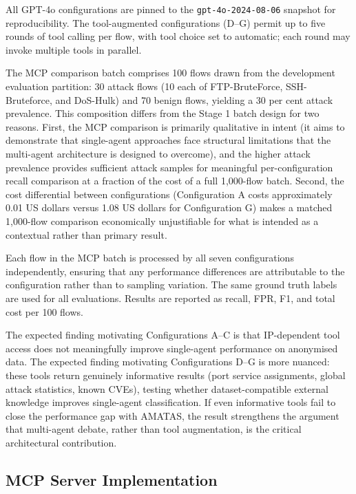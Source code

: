 \documentclass[../main.tex]{subfiles}
\begin{document}
\noindent All GPT-4o configurations are pinned to the \texttt{gpt-4o-2024-08-06} snapshot for reproducibility. The tool-augmented configurations (D--G) permit up to five rounds of tool calling per flow, with tool choice set to automatic; each round may invoke multiple tools in parallel.

The MCP comparison batch comprises 100 flows drawn from the development evaluation partition: 30 attack flows (10 each of FTP-BruteForce, SSH-Bruteforce, and DoS-Hulk) and 70 benign flows, yielding a 30 per cent attack prevalence. This composition differs from the Stage 1 batch design for two reasons. First, the MCP comparison is primarily qualitative in intent (it aims to demonstrate that single-agent approaches face structural limitations that the multi-agent architecture is designed to overcome), and the higher attack prevalence provides sufficient attack samples for meaningful per-configuration recall comparison at a fraction of the cost of a full 1,000-flow batch. Second, the cost differential between configurations (Configuration A costs approximately 0.01 US dollars versus 1.08 US dollars for Configuration G) makes a matched 1,000-flow comparison economically unjustifiable for what is intended as a contextual rather than primary result.

Each flow in the MCP batch is processed by all seven configurations independently, ensuring that any performance differences are attributable to the configuration rather than to sampling variation. The same ground truth labels are used for all evaluations. Results are reported as recall, FPR, F1, and total cost per 100 flows.

The expected finding motivating Configurations A--C is that IP-dependent tool access does not meaningfully improve single-agent performance on anonymised data. The expected finding motivating Configurations D--G is more nuanced: these tools return genuinely informative results (port service assignments, global attack statistics, known CVEs), testing whether dataset-compatible external knowledge improves single-agent classification. If even informative tools fail to close the performance gap with AMATAS, the result strengthens the argument that multi-agent debate, rather than tool augmentation, is the critical architectural contribution.

\subsection{MCP Server Implementation}
\label{sec:mcp-server-implementation}
\end{document}
